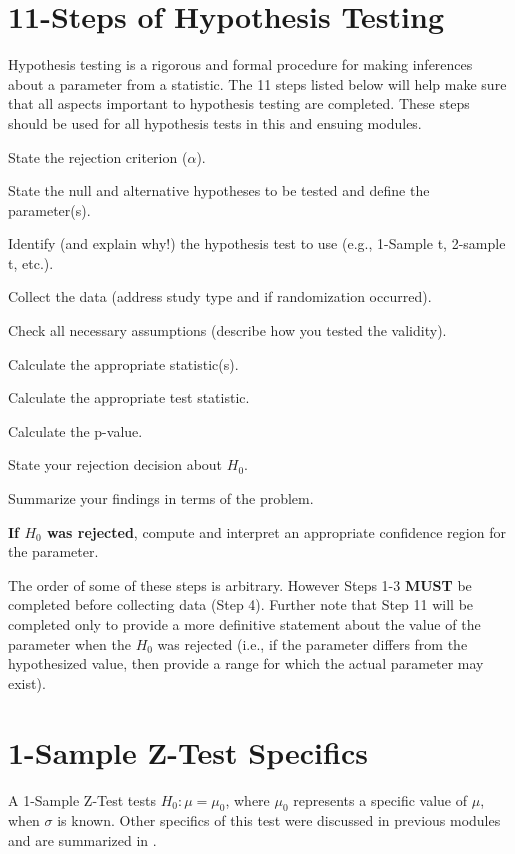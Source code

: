 \documentclass[10pt,openany]{book}\usepackage[]{graphicx}\usepackage[]{color}
\begin{document}
\section{11-Steps of Hypothesis Testing} \label{sec:11Steps}
\vspace*{-4pt}
Hypothesis testing is a rigorous and formal procedure for making inferences about a parameter from a statistic. The 11 steps listed below will help make sure that all aspects important to hypothesis testing are completed. These steps should be used for all hypothesis tests in this and ensuing modules.

\vspace*{-8pt}
\begin{Enumerate}
  \item State the rejection criterion ($\alpha$).
  \item State the null and alternative hypotheses to be tested and define the parameter(s).
  \item Identify (and explain why!) the hypothesis test to use (e.g., 1-Sample t, 2-sample t, etc.).
  \item Collect the data (address study type and if randomization occurred).
  \item Check all necessary assumptions (describe how you tested the validity).
  \item Calculate the appropriate statistic(s).
  \item Calculate the appropriate test statistic.
  \item Calculate the p-value.
  \item State your rejection decision about $H_{0}$.
  \item Summarize your findings in terms of the problem.
  \item \textbf{If $H_{0}$ was rejected}, compute and interpret an appropriate confidence region for the parameter.
\end{Enumerate}
\vspace*{-6pt}

The order of some of these steps is arbitrary. However Steps 1-3 \textbf{MUST} be completed before collecting data (Step 4). Further note that Step 11 will be completed only to provide a more definitive statement about the value of the parameter when the $H_{0}$ was rejected (i.e., if the parameter differs from the hypothesized value, then provide a range for which the actual parameter may exist).


\section{1-Sample Z-Test Specifics} \label{sect:ZTest}
\vspace*{-4pt}
A 1-Sample Z-Test tests $H_{0}:\mu=\mu_{0}$, where $\mu_{0}$ represents a specific value of $\mu$, when $\sigma$ is known. Other specifics of this test were discussed in previous modules and are summarized in .
\end{document}
